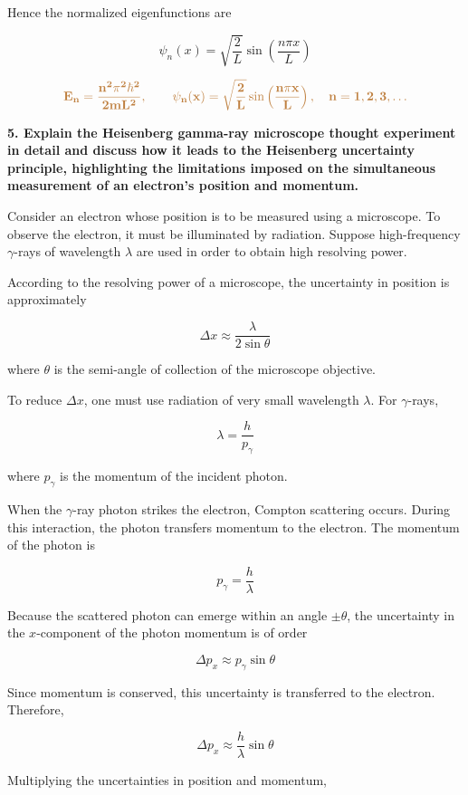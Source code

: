 \documentclass[a4paper, 12pt]{article}
\begin{document}
Hence the normalized eigenfunctions are

\[
\psi_n(x)=\sqrt{\frac{2}{L}}\sin\left(\frac{n\pi x}{L}\right)
\]

\[
\textcolor{brown}{\mathbf{E_n=\dfrac{n^2\pi^2\hbar^2}{2mL^2}, \qquad 
\psi_n(x)=\sqrt{\dfrac{2}{L}}\sin\left(\dfrac{n\pi x}{L}\right), \quad n=1,2,3,\dots}}
\]


\textbf{5. Explain the Heisenberg gamma-ray microscope thought experiment in detail and discuss how it leads to the Heisenberg uncertainty principle, highlighting the limitations imposed on the simultaneous measurement of an electron's position and momentum.}

\vspace{0.3cm}

Consider an electron whose position is to be measured using a microscope. 
To observe the electron, it must be illuminated by radiation. 
Suppose high-frequency $\gamma$-rays of wavelength $\lambda$ are used in order to obtain high resolving power.

According to the resolving power of a microscope, the uncertainty in position is approximately

\[
\Delta x \approx \frac{\lambda}{2\sin\theta}
\]

where $\theta$ is the semi-angle of collection of the microscope objective.

To reduce $\Delta x$, one must use radiation of very small wavelength $\lambda$. 
For $\gamma$-rays,

\[
\lambda = \frac{h}{p_\gamma}
\]

where $p_\gamma$ is the momentum of the incident photon.

When the $\gamma$-ray photon strikes the electron, Compton scattering occurs. 
During this interaction, the photon transfers momentum to the electron. 
The momentum of the photon is

\[
p_\gamma = \frac{h}{\lambda}
\]

Because the scattered photon can emerge within an angle $\pm \theta$, the uncertainty in the $x$-component of the photon momentum is of order

\[
\Delta p_x \approx p_\gamma \sin\theta
\]

Since momentum is conserved, this uncertainty is transferred to the electron. Therefore,

\[
\Delta p_x \approx \frac{h}{\lambda} \sin\theta
\]

Multiplying the uncertainties in position and momentum,
\end{document}
